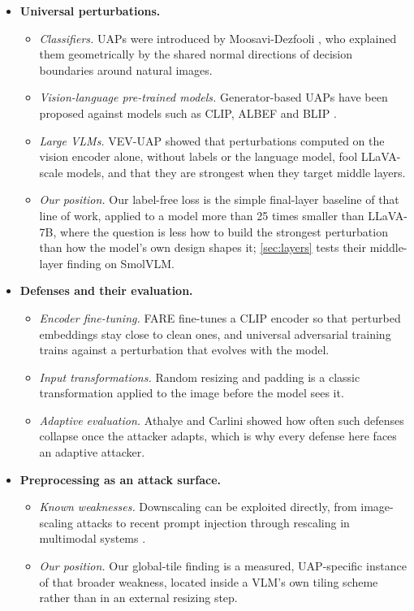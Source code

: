 \documentclass[10pt,twocolumn,letterpaper]{article}
\begin{document}
\begin{itemize}[leftmargin=*,itemsep=2pt,topsep=2pt]
  \item \textbf{Universal perturbations.}
  \begin{itemize}[leftmargin=*,itemsep=1pt,topsep=1pt]
    \item \emph{Classifiers.} UAPs were introduced by Moosavi-Dezfooli \etal \cite{moosavi2017universal}, who explained them geometrically by the shared normal directions of decision boundaries around natural images.
    \item \emph{Vision-language pre-trained models.} Generator-based UAPs have been proposed against models such as CLIP, ALBEF and BLIP \cite{zhang2024etu,fang2024cpgc}.
    \item \emph{Large VLMs.} VEV-UAP \cite{kim2024vevuap} showed that perturbations computed on the vision encoder alone, without labels or the language model, fool LLaVA-scale models, and that they are strongest when they target middle layers.
    \item \emph{Our position.} Our label-free loss is the simple final-layer baseline of that line of work, applied to a model more than 25 times smaller than LLaVA-7B, where the question is less how to build the strongest perturbation than how the model's own design shapes it; \cref{sec:layers} tests their middle-layer finding on SmolVLM.
  \end{itemize}
  \item \textbf{Defenses and their evaluation.}
  \begin{itemize}[leftmargin=*,itemsep=1pt,topsep=1pt]
    \item \emph{Encoder fine-tuning.} FARE \cite{schlarmann2024fare} fine-tunes a CLIP encoder so that perturbed embeddings stay close to clean ones, and universal adversarial training \cite{shafahi2020uat} trains against a perturbation that evolves with the model.
    \item \emph{Input transformations.} Random resizing and padding \cite{xie2018randomization} is a classic transformation applied to the image before the model sees it.
    \item \emph{Adaptive evaluation.} Athalye \etal \cite{athalye2018obfuscated} and Carlini \etal \cite{carlini2019evaluating} showed how often such defenses collapse once the attacker adapts, which is why every defense here faces an adaptive attacker.
  \end{itemize}
  \item \textbf{Preprocessing as an attack surface.}
  \begin{itemize}[leftmargin=*,itemsep=1pt,topsep=1pt]
    \item \emph{Known weaknesses.} Downscaling can be exploited directly, from image-scaling attacks \cite{xiao2019scaling,quiring2020adversarial} to recent prompt injection through rescaling in multimodal systems \cite{zeeshan2025chameleon}.
    \item \emph{Our position.} Our global-tile finding is a measured, UAP-specific instance of that broader weakness, located inside a VLM's own tiling scheme rather than in an external resizing step.
  \end{itemize}
\end{itemize}
\end{document}
